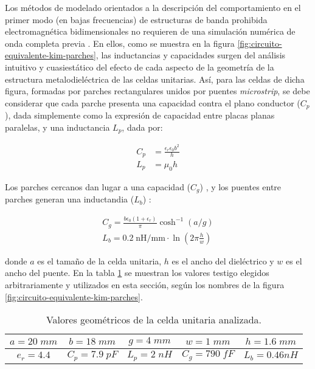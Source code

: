 Los métodos de modelado orientados a la descripción del comportamiento en el primer modo (en bajas frecuencias) de estructuras de banda prohibida electromagnética bidimensionales no requieren de una simulación numérica de onda completa previa \cite{KimSchuttAine:AnalysisHybrid}. En ellos, como se muestra en la figura \ref{fig:circuito-equivalente-kim-parches}, las inductancias y capacidades surgen del análisis intuitivo y cuasiestático del efecto de cada aspecto de la geometría de la estructura metalodieléctrica de las celdas unitarias. Así, para las celdas de dicha figura, formadas por parches rectangulares unidos por puentes \textit{microstrip}, se debe considerar que cada parche presenta una capacidad contra el plano conductor ($C_p$), dada simplemente como la expresión de capacidad entre placas planas paralelas, y una inductancia $L_p$, dada por:

\begin{align}
\label{eq:Cp_Lp}
C_p &= \frac{\epsilon_r \epsilon_0 b^2}{h} \\
L_p &= \mu_0 h
\end{align}

Los parches cercanos dan lugar a una capacidad ($C_g$) \cite{Marcela:Tesis} \cite{Sievenpiper:Thesis} \cite{KimSchuttAine:AnalysisHybrid}, y los puentes entre parches generan una inductandia ($L_{b}$) \cite{KimSchuttAine:AnalysisHybrid}:

\begin{align}
\label{eq:cgap-y-lgap}
C_{g} = \frac{b \epsilon_0 (1+\epsilon_r)}{\pi} \cosh^{-1} (a / g) \\
L_{b} = 0.2\; \text{nH/mm} \cdot \ln (2\pi \frac{h}{w})
\end{align}

donde $a$ es el tamaño de la celda unitaria, $h$ es el ancho del dieléctrico y $w$ es el ancho del puente. En la tabla \ref{table:CeldaUnitariaFacil-AnalisisiCircuital} se muestran los valores testigo elegidos arbitrariamente y utilizados en esta sección, según los nombres de la figura \ref{fig:circuito-equivalente-kim-parches}.

\begin{table}
	\centering
	\begin{tabular}{|c|c|c|c|c|}
		
		\hline
		$a = 20\;mm$ & $b = 18 \;mm$ & $g = 4 \;mm$ & $w = 1\;mm$ & $h = 1.6\;mm$ \\ 
		\hline
		$e_r = 4.4$ & $C_p = 7.9\;pF$ & $L_p = 2\;nH$ & $C_g = 790\; fF$ & $L_b = 0.46 nH$ \\ 
		\hline 
	\end{tabular}
	\caption{Valores geométricos de la celda unitaria analizada.}
	\label{table:CeldaUnitariaFacil-AnalisisiCircuital}
\end{table}



